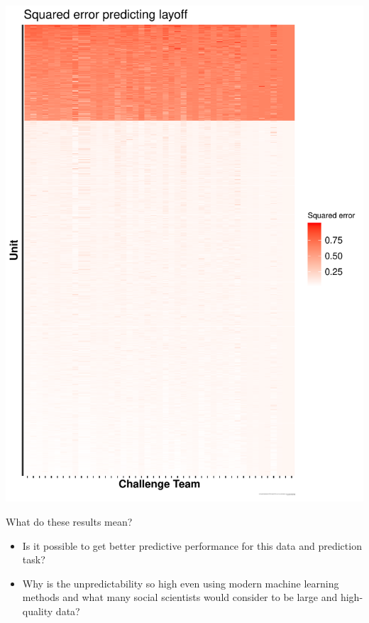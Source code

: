 \documentclass{beamer}
\begin{document}
\begin{frame}
\begin{center}
\includegraphics[width=0.30\textheight]{figures/layoff_ysort_mse_unit_outcome_xsort_mse_account_outcome.pdf}
\end{center}

\end{frame}
\begin{frame}

\begin{center}
\Large{What do these results mean?}
\end{center}

\end{frame}
\begin{frame}

\begin{itemize}
\item Is it possible to get better predictive performance for this data and prediction task?
\pause
\item Why is the unpredictability so high even using modern machine learning methods and what many social scientists would consider to be large and high-quality data?
\end{itemize}

\end{frame}
\end{document}
